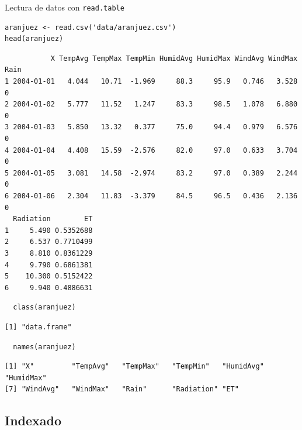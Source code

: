 \documentclass[xcolor={usenames,svgnames,dvipsnames}]{beamer}
\begin{document}
\begin{frame}[fragile,label=sec-5-1-4]{Lectura de datos con \texttt{read.table}}
 \lstset{language=R,label= ,caption= ,numbers=none}
\begin{lstlisting}
aranjuez <- read.csv('data/aranjuez.csv')
head(aranjuez)
\end{lstlisting}

\begin{verbatim}
           X TempAvg TempMax TempMin HumidAvg HumidMax WindAvg WindMax Rain
1 2004-01-01   4.044   10.71  -1.969     88.3     95.9   0.746   3.528    0
2 2004-01-02   5.777   11.52   1.247     83.3     98.5   1.078   6.880    0
3 2004-01-03   5.850   13.32   0.377     75.0     94.4   0.979   6.576    0
4 2004-01-04   4.408   15.59  -2.576     82.0     97.0   0.633   3.704    0
5 2004-01-05   3.081   14.58  -2.974     83.2     97.0   0.389   2.244    0
6 2004-01-06   2.304   11.83  -3.379     84.5     96.5   0.436   2.136    0
  Radiation        ET
1     5.490 0.5352688
2     6.537 0.7710499
3     8.810 0.8361229
4     9.790 0.6861381
5    10.300 0.5152422
6     9.940 0.4886631
\end{verbatim}

\lstset{language=R,label= ,caption= ,numbers=none}
\begin{lstlisting}
  class(aranjuez)
\end{lstlisting}

\begin{verbatim}
[1] "data.frame"
\end{verbatim}

\lstset{language=R,label= ,caption= ,numbers=none}
\begin{lstlisting}
  names(aranjuez)
\end{lstlisting}

\begin{verbatim}
[1] "X"         "TempAvg"   "TempMax"   "TempMin"   "HumidAvg"  "HumidMax" 
[7] "WindAvg"   "WindMax"   "Rain"      "Radiation" "ET"
\end{verbatim}
\end{frame}

\subsection{Indexado}
\label{sec-5-2}
\end{document}
